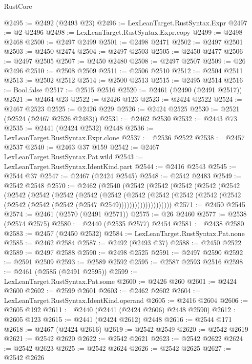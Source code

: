 \begin{lexlean}{RustCore}
\begin{coremodule}
@2495 := @2492 (@2493 @23)
@2496 := LexLeanTarget.RustSyntax.Expr
@2497 := @2 @2496
@2498 := LexLeanTarget.RustSyntax.Expr.copy
@2499 := @2498 @2468
@2500 := @2497 @2499
@2501 := @2498 @2471
@2502 := @2497 @2501
@2503 := @2450 @2474
@2504 := @2497 @2503
@2505 := @2450 @2477
@2506 := @2497 @2505
@2507 := @2450 @2480
@2508 := @2497 @2507
@2509 := @26 @2496
@2510 := @2508 @2509
@2511 := @2506 @2510
@2512 := @2504 @2511
@2513 := @2502 @2512
@2514 := @2500 @2513
@2515 := @2495 @2514
@2516 := Bool.false
@2517 := @2515 @2516
@2520 := @2461 (@2490 (@2491 @2517))
@2521 := @2464 @23
@2522 := @2426 @123
@2523 := @2424 @2522
@2524 := @2467 @2523
@2525 := @2426 @229
@2526 := @2424 @2525
@2530 := @2521 (@2524 (@2467 @2526 @2483))
@2531 := @2462 @2530
@2532 := @2443 @73
@2535 := @2441 (@2424 @2532) @2448
@2536 := LexLeanTarget.RustSyntax.Expr.clone
@2537 := @2536 @2522
@2538 := @2457 @2537
@2540 := @2463 @37 @159
@2542 := @2467 LexLeanTarget.RustSyntax.Pat.wild
@2543 := LexLeanTarget.RustSyntax.IdentKind.part
@2544 := @2416 @2543
@2545 := @2544 @37
@2547 := @2467 (@2424 @2545)
@2548 := @2542 @2483
@2549 := @2542 @2548
@2570 := @2462
    (@2540
      (@2542
        (@2542
          (@2542
            (@2542
              (@2542
                (@2542
                  (@2542
                    (@2542
                      (@2542
                        (@2542
                          (@2542
                            (@2542
                              (@2542
                                (@2542 (@2542 (@2542 (@2542 (@2542 (@2547 @2549))))))))))))))))))))
@2571 := @2450 @2545
@2574 := @2461 (@2570 (@2491 @2571))
@2575 := @26 @2460
@2577 := @2538 (@2574 @2575)
@2580 := @2440 (@2535 @2577) @2454
@2581 := @2438 @2580
@2583 := @2457 (@2450 @2532)
@2584 := LexLeanTarget.RustSyntax.Pat.none
@2585 := @2462 @2584
@2587 := @2492 (@2493 @37)
@2588 := @2450 @2522
@2589 := @2497 @2588
@2590 := @2498 @2525
@2591 := @2497 @2590
@2592 := @2591 @2509
@2593 := @2589 @2592
@2595 := @2587 @2593 @2516
@2598 := @2461 (@2585 (@2491 @2595))
@2599 := LexLeanTarget.RustSyntax.Pat.some
@2600 := @2426 @260
@2601 := @2424 @2600
@2602 := @2599 @2601
@2603 := @2462 @2602
@2604 := LexLeanTarget.RustSyntax.IdentKind.operand
@2605 := @2416 @2604
@2606 := @2605 @192
@2611 := @2440 (@2441 (@2424 @2606) @2448 @2590)
@2612 := @2605 @123
@2615 := @2441 (@2424 @2612) @2448
@2616 := @2544 @171
@2618 := @2467 (@2424 @2616)
@2619 := @2542 @2549
@2620 := @2542 @2619
@2621 := @2542 @2620
@2622 := @2542 @2621
@2623 := @2542 @2622
@2624 := @2542 @2623
@2625 := @2542 @2624
@2626 := @2542 @2625
@2627 := @2542 @2626

\end{coremodule}
\end{lexlean}
